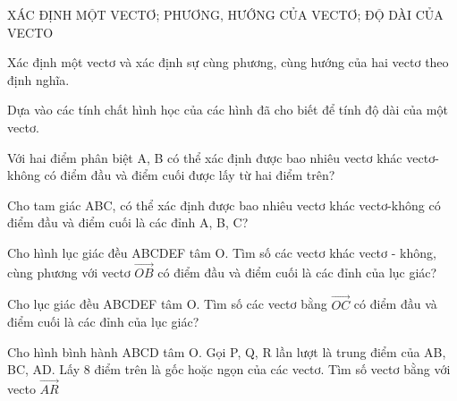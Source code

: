 \begin{dang}{XÁC ĐỊNH MỘT VECTƠ; PHƯƠNG, HƯỚNG CỦA VECTƠ; ĐỘ DÀI CỦA VECTO}
    \begin{pp}
        \item Xác định một vectơ và xác định sự cùng phương, cùng hướng của hai vectơ theo định nghĩa.
        \item Dựa vào các tính chất hình học của các hình đã cho biết để tính độ dài của một vectơ.
    \end{pp}

    \begin{vd}
        Với hai điểm phân biệt A, B có thể xác định được bao nhiêu vectơ khác vectơ-không có điểm đầu và điểm cuối được lấy từ hai điểm trên?
    \end{vd}

    \begin{vd}
        Cho tam giác ABC, có thể xác định được bao nhiêu vectơ khác vectơ-không có điểm đầu và điểm cuối là các đỉnh A, B, C?
    \end{vd}

    \begin{vd}
        Cho hình lục giác đều ABCDEF tâm O. Tìm số các vectơ khác vectơ - không, cùng phương với vectơ $\vec{OB}$ có điểm đầu và điểm cuối là các đỉnh của lục giác?
    \end{vd}

    \begin{vd}
        Cho lục giác đều ABCDEF tâm O. Tìm số các vectơ bằng $\vec{OC}$ có điểm đầu và điểm cuối là các đỉnh của lục giác?
    \end{vd}

    \begin{vd}
        Cho hình bình hành ABCD tâm O. Gọi P, Q, R lần lượt là trung điểm của AB, BC, AD. Lấy 8 điểm trên là gốc hoặc ngọn của các vectơ. Tìm số vectơ bằng với vecto $\vec{AR}$
    \end{vd}


\end{dang}

